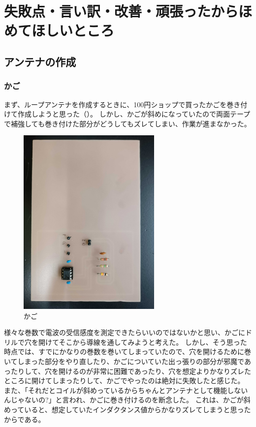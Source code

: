 \documentclass[report.tex]{subfiles}
\begin{document}
\section{失敗点・言い訳・改善・頑張ったからほめてほしいところ}

\subsection{アンテナの作成}

\subsubsection{かご}

まず、ループアンテナを作成するときに、100円ショップで買ったかごを巻き付けて作成しようと思った（）。
しかし、かごが斜めになっていたので両面テープで補強しても巻き付けた部分がどうしてもズレてしまい、作業が進まなかった。

\begin{figure}[H]
	\centering
	\includegraphics[width=7cm]{use/1.jpg}
	\caption{かご}
	\label{fig:kago}
\end{figure}

様々な巻数で電波の受信感度を測定できたらいいのではないかと思い、かごにドリルで穴を開けてそこから導線を通してみようと考えた。
しかし、そう思った時点では、すでにかなりの巻数を巻いてしまっていたので、穴を開けるために巻いてしまった部分をやり直したり、かごについていた出っ張りの部分が邪魔であったりして、穴を開けるのが非常に困難であったり、穴を想定よりかなりズレたところに開けてしまったりして、かごでやったのは絶対に失敗したと感じた。
また、「それだとコイルが斜めっているからちゃんとアンテナとして機能しないんじゃないの?」と言われ、かごに巻き付けるのを断念した。
これは、かごが斜めっていると、想定していたインダクタンス値からかなりズレてしまうと思ったからである。
\end{document}
